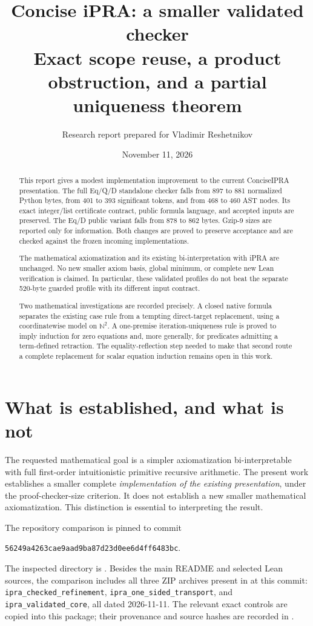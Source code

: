 \documentclass[11pt]{article}
\title{Concise iPRA: a smaller validated checker\\[5pt]
\large Exact scope reuse, a product obstruction, and a partial uniqueness theorem}
\author{Research report prepared for Vladimir Reshetnikov}
\date{November 11, 2026}
\theoremstyle{definition}\newtheorem{definition}[theorem]{Definition}
\theoremstyle{remark}\newtheorem{remark}[theorem]{Remark}
\begin{document}
\maketitle
\begin{abstract}
This report gives a modest implementation improvement to the current
ConciseIPRA presentation. The full Eq/Q/D standalone checker falls from
897 to 881 normalized Python bytes, from 401 to 393 significant tokens,
and from 468 to 460 AST nodes. Its exact integer/list certificate contract,
public formula language, and accepted inputs are preserved. The Eq/D
public variant falls from 878 to 862 bytes. Gzip-9 sizes are reported only
for information. Both changes are proved to preserve acceptance and are
checked against the frozen incoming implementations.

The mathematical axiomatization and its existing bi-interpretation with
iPRA are unchanged. No new smaller axiom basis, global minimum, or complete
new Lean verification is claimed. In particular, these validated profiles
do not beat the separate 520-byte guarded profile with its different
input contract.

Two mathematical investigations are recorded precisely. A closed native
formula separates the existing case rule from a tempting direct-target
replacement, using a coordinatewise model on $\mathbb N^2$. A one-premise
iteration-uniqueness rule is proved to imply induction for zero equations
and, more generally, for predicates admitting a term-defined retraction.
The equality-reflection step needed to make that second route a complete
replacement for scalar equation induction remains open in this work.
\end{abstract}
\newpage
\tableofcontents
\newpage

\section{What is established, and what is not}

The requested mathematical goal is a simpler axiomatization bi-interpretable
with full first-order intuitionistic primitive recursive arithmetic.
The present work establishes a smaller complete \emph{implementation of the
existing presentation}, under the proof-checker-size criterion. It does
not establish a new smaller mathematical axiomatization. This distinction
is essential to interpreting the result.

The repository comparison is pinned to commit
\begin{center}\small\texttt{56249a4263cae9aad9ba87d23d0ee6d4ff6483bc}.\end{center}
The inspected directory is
. Besides the main
README and selected Lean sources, the comparison includes all three ZIP
archives present in  at this commit:
\texttt{ipra\_checked\_refinement}, \texttt{ipra\_one\_sided\_transport},
and \texttt{ipra\_validated\_core}, all dated 2026-11-11.
The relevant exact controls are copied into this package; their provenance
and source hashes are recorded in .
\end{document}
